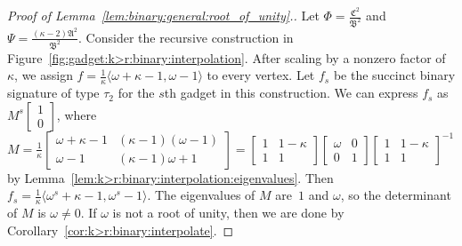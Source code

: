 \documentclass[11pt]{article}
\begin{document}
\begin{proof}[Proof of Lemma~\ref{lem:binary:general:root_of_unity}.]
 Let $\Phi = \frac{\mathfrak{C}^2}{\mathfrak{B}^2}$ and $\Psi = \frac{(\kappa - 2) \mathfrak{A}^2}{\mathfrak{B}^2}$.
 Consider the recursive construction in Figure~\ref{fig:gadget:k>r:binary:interpolation}.
 After scaling by a nonzero factor of $\kappa$,
 we assign $f = \frac{1}{\kappa} \langle \omega + \kappa - 1, \omega - 1 \rangle$ to every vertex.
 Let $f_s$ be the succinct binary signature of type $\tau_2$ for the $s$th gadget in this construction.
 We can express $f_s$ as $M^s \left[\begin{smallmatrix} 1 \\ 0 \end{smallmatrix}\right]$,
 where $M = \frac{1}{\kappa} \left[\begin{smallmatrix} \omega + \kappa - 1 & (\kappa - 1) (\omega - 1) \\ \omega - 1 & (\kappa - 1) \omega + 1 \end{smallmatrix}\right]
 = \left[\begin{smallmatrix} 1 & 1 - \kappa \\ 1 & 1 \end{smallmatrix}\right]
 \left[\begin{smallmatrix} \omega & 0 \\ 0 & 1 \end{smallmatrix}\right]
 \left[\begin{smallmatrix} 1 & 1 - \kappa \\ 1 & 1 \end{smallmatrix}\right]^{-1}$
 by Lemma~\ref{lem:k>r:binary:interpolation:eigenvalues}.
 Then $f_s = \frac{1}{\kappa} \langle \omega^s + \kappa - 1, \omega^s - 1 \rangle$.
 The eigenvalues of $M$ are~$1$ and $\omega$,
 so the determinant of $M$ is $\omega \ne 0$.
 If $\omega$ is not a root of unity,
 then we are done by Corollary~\ref{cor:k>r:binary:interpolate}.
 

\end{proof}
\end{document}
